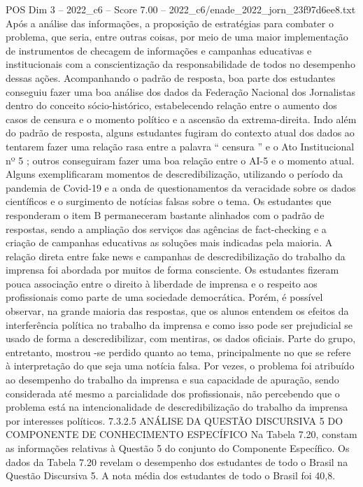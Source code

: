 \begin{textsample}{POS Dim 3 – 2022\_c6 – Score 7.00 – 2022\_c6/enade\_2022\_jorn\_23f97d6ee8.txt}
Após a análise das informações, a proposição de estratégias para combater o problema, que seria, entre outras coisas, por meio de uma maior implementação de instrumentos de checagem de informações e campanhas educativas e institucionais com a conscientização da responsabilidade de todos no desempenho dessas ações.
Acompanhando o padrão de resposta, boa parte dos estudantes conseguiu fazer uma boa análise dos dados da Federação Nacional dos Jornalistas dentro do conceito sócio-histórico, estabelecendo relação entre o aumento dos casos de censura e o momento político e a ascensão da extrema-direita.
Indo além do padrão de resposta, alguns estudantes fugiram do contexto atual dos dados ao tentarem fazer uma relação rasa entre a palavra “ censura ” e o Ato Institucional nº 5 ; outros conseguiram fazer uma boa relação entre o AI-5 e o momento atual.
Alguns exemplificaram momentos de descredibilização, utilizando o período da pandemia de Covid-19 e a onda de questionamentos da veracidade sobre os dados científicos e o surgimento de notícias falsas sobre o tema.
Os estudantes que responderam o item B permaneceram bastante alinhados com o padrão de respostas, sendo a ampliação dos serviços das agências de fact-checking e a criação de campanhas educativas as soluções mais indicadas pela maioria.
A relação direta entre fake news e campanhas de descredibilização do trabalho da imprensa foi abordada por muitos de forma consciente.
Os estudantes fizeram pouca associação entre o direito à liberdade de imprensa e o respeito aos profissionais como parte de uma sociedade democrática.
Porém, é possível observar, na grande maioria das respostas, que os alunos entendem os efeitos da interferência política no trabalho da imprensa e como isso pode ser prejudicial se usado de forma a descredibilizar, com mentiras, os dados oficiais.
Parte do grupo, entretanto, mostrou -se perdido quanto ao tema, principalmente no que se refere à interpretação do que seja uma notícia falsa.
Por vezes, o problema foi atribuído ao desempenho do trabalho da imprensa e sua capacidade de apuração, sendo considerada até mesmo a parcialidade dos profissionais, não percebendo que o problema está na intencionalidade de descredibilização do trabalho da imprensa por interesses políticos. 7.3.2.5 ANÁLISE DA QUESTÃO DISCURSIVA 5 DO COMPONENTE DE CONHECIMENTO ESPECÍFICO Na Tabela 7.20, constam as informações relativas à Questão 5 do conjunto do Componente Específico.
Os dados da Tabela 7.20 revelam o desempenho dos estudantes de todo o Brasil na Questão Discursiva 5.
A nota média dos estudantes de todo o Brasil foi 40,8.

\end{textsample}
